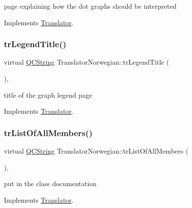 page explaining how the dot graph\textquotesingle{}s should be interpreted 

Implements \mbox{\hyperlink{class_translator}{Translator}}.

\mbox{\label{class_translator_norwegian_ada178c4fca36d1dcd703f23e63c060f7}} 
\subsubsection{\texorpdfstring{trLegendTitle()}{trLegendTitle()}}
{\footnotesize\ttfamily virtual \mbox{\hyperlink{class_q_c_string}{Q\+C\+String}} Translator\+Norwegian\+::tr\+Legend\+Title (\begin{DoxyParamCaption}{ }\end{DoxyParamCaption})\hspace{0.3cm}{\ttfamily [inline]}, {\ttfamily [virtual]}}

title of the graph legend page 

Implements \mbox{\hyperlink{class_translator}{Translator}}.

\mbox{\label{class_translator_norwegian_a073db1c9cb501fcbcfbb32182270314f}} 
\subsubsection{\texorpdfstring{trListOfAllMembers()}{trListOfAllMembers()}}
{\footnotesize\ttfamily virtual \mbox{\hyperlink{class_q_c_string}{Q\+C\+String}} Translator\+Norwegian\+::tr\+List\+Of\+All\+Members (\begin{DoxyParamCaption}{ }\end{DoxyParamCaption})\hspace{0.3cm}{\ttfamily [inline]}, {\ttfamily [virtual]}}

put in the class documentation 

Implements \mbox{\hyperlink{class_translator}{Translator}}.

\mbox{\label{class_translator_norwegian_a5bd6c96821a9d80b2dc3c54ecf11e183}} 
